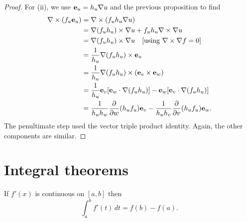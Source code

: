 \documentclass[10pt, a4paper]{article}
\begin{document}
\begin{proposition}
\begin{proof}
        For
        (ii),
        we use $\mathbf{e}_u = h_u\mathbf{\nabla} u$ and the previous proposition to find
        \begin{align*}
            \mathbf{\nabla}\times(f_u\mathbf{e}_u) &= \mathbf{\nabla}\times(f_uh_u\mathbf{\nabla} u)\\
            &= \mathbf{\nabla}(f_u h_u)\times\mathbf{\nabla} u + f_uh_u\mathbf{\nabla}\times\mathbf{\nabla} u\\
            &= \mathbf{\nabla}(f_u h_u)\times\mathbf{\nabla} u \quad \textrm{[using $\mathbf{\nabla}\times\mathbf{\nabla} f = 0$]}\\
            &= \frac{1}{h_u}\mathbf{\nabla}(f_uh_u)\times\mathbf{e}_u\\
            &= \frac{1}{h_u}\mathbf{\nabla}(f_uh_u)\times(\mathbf{e}_v\times\mathbf{e}_w)\\
            &= \frac{1}{h_u}\mathbf{e}_v[\mathbf{e}_w\cdot\mathbf{\nabla}(f_uh_u)] - \mathbf{e}_w[\mathbf{e}_v\cdot\mathbf{\nabla}(f_uh_u)]\\
            &= \frac{1}{h_uh_w}\frac{\partial }{\partial w}(h_uf_u)\mathbf{e}_v - \frac{1}{h_uh_v}\frac{\partial }{\partial v}(h_uf_u)\mathbf{e}_w.
        \end{align*}
        The penultimate step used the vector triple product identity.
        Again,
        the other components are similar.
    \end{proof}
\end{proposition}

\newpage

\section{Integral theorems}

\begin{theorem}
    If $f'(x)$ is continuous on $[a, b]$ then
    \[
    \int_{a}^{b}f'(t)\,dt = f(b) - f(a).
    \]
\end{theorem}
\end{document}
